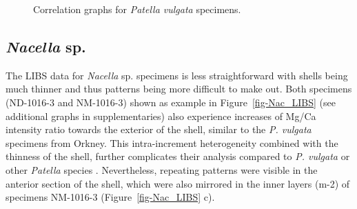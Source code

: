 \documentclass[
  authoryear,
  preprint,
  3p]{elsarticle}
\begin{document}
\begin{figure}


\caption{\label{fig-Pat_Corr}Correlation graphs for \emph{Patella
vulgata} specimens.}

\end{figure}%

\subsection{\texorpdfstring{\emph{Nacella}
sp.}{Nacella sp.}}\label{nacella-sp.}

The LIBS data for \emph{Nacella} sp. specimens is less straightforward
with shells being much thinner and thus patterns being more difficult to
make out. Both specimens (ND-1016-3 and NM-1016-3) shown as example in
Figure~\ref{fig-Nac_LIBS} (see additional graphs in supplementaries)
also experience increases of Mg/Ca intensity ratio towards the exterior
of the shell, similar to the \emph{P. vulgata} specimens from Orkney.
This intra-increment heterogeneity combined with the thinness of the
shell, further complicates their analysis compared to \emph{P. vulgata}
or other \emph{Patella} species \citep{Hausmann2019-fi}. Nevertheless,
repeating patterns were visible in the anterior section of the shell,
which were also mirrored in the inner layers (m-2) of specimens
NM-1016-3 (Figure~\ref{fig-Nac_LIBS} c).
\end{document}
